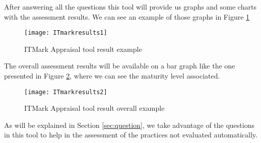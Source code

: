 After answering all the questions this tool will provide us graphs and some charts with the assessment results. We can see an example of those graphs in Figure \ref{fig:itmark_result1}

\begin{figure}[H]
	\begin{center}
		\leavevmode
		\texttt{[image: ITmarkresults1]}
		\caption{ITMark Appraisal tool result example}
		\label{fig:itmark_result1}
	\end{center}
\end{figure}

The overall assessment results will be available on a bar graph like the one presented in Figure \ref{fig:itmark_result2}, where we can see the maturity level associated.

\begin{figure}[H]
	\begin{center}
		\leavevmode
		\texttt{[image: ITmarkresults2]}
		\caption{ITMark Appraisal tool result overall example}
		\label{fig:itmark_result2}
	\end{center}
\end{figure}

As will be explained in Section \ref{sec:question}, we take advantage of the questions in this tool to help in the assessment of the practices not evaluated automatically.